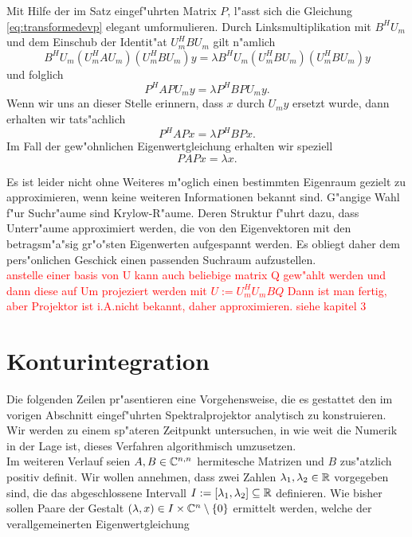 Mit Hilfe der im Satz eingef"uhrten Matrix $P$, l"asst sich die Gleichung
\eqref{eq:transformedevp} elegant umformulieren. Durch Linksmultiplikation
mit $B^H U_m$ und dem Einschub der Identit"at $U_m^H B U_m$ gilt n"amlich
\[
B^H U_m (U_m^H A U_m)(U_m^H B U_m)y = \lambda B^H U_m (U_m^H B U_m)(U_m^H B U_m)y
\]
und folglich
\[
P^H A P U_m y = \lambda P^H B P U_m y.
\]
Wenn wir uns an dieser Stelle erinnern, dass $x$ durch $U_m y$ ersetzt wurde, dann
erhalten wir tats"achlich
\[
P^H A P x = \lambda P^H B P x.
\]
Im Fall der gew"ohnlichen Eigenwertgleichung erhalten wir speziell
\[
P A P x = \lambda x.
\]


Es ist leider nicht ohne Weiteres m"oglich einen bestimmten Eigenraum gezielt
zu approximieren, wenn keine weiteren Informationen bekannt sind. G"angige
Wahl f"ur Suchr"aume sind Krylow-R"aume. Deren Struktur f"uhrt dazu, dass
Unterr"aume approximiert werden, die von den Eigenvektoren mit den betragsm"a"sig
gr"o"sten Eigenwerten aufgespannt werden. Es obliegt daher dem pers"onlichen
Geschick einen passenden Suchraum aufzustellen.\\



\textcolor{red}{anstelle einer basis von U kann auch beliebige matrix Q gew"ahlt
werden und dann diese auf Um projeziert werden mit $U:=U_m^H U_m B Q$ Dann
ist man fertig, aber Projektor ist i.A.nicht bekannt, daher approximieren. siehe
kapitel 3}

\section{Konturintegration}\label{sec:kontur}

Die folgenden Zeilen pr"asentieren eine Vorgehensweise, die es gestattet den im vorigen
Abschnitt eingef"uhrten Spektralprojektor analytisch zu konstruieren. Wir werden
zu einem sp"ateren Zeitpunkt untersuchen, in wie weit die Numerik in der Lage ist, dieses
Verfahren algorithmisch umzusetzen.\\

Im weiteren Verlauf seien $A, B \in\mathbb{C}^{n,n}$ hermitesche Matrizen und $B$ zus"atzlich
positiv definit. Wir wollen annehmen, dass zwei Zahlen $\lambda_1, \lambda_2 \in \mathbb{R}$
vorgegeben sind, die das abgeschlossene Intervall $I:=[\lambda_1, \lambda_2] \subseteq \mathbb{R}$ definieren.
Wie bisher sollen Paare der Gestalt $(\lambda, x) \in I \times \mathbb{C}^n \setminus\{0\}$ ermittelt werden,
welche der verallgemeinerten Eigenwertgleichung


